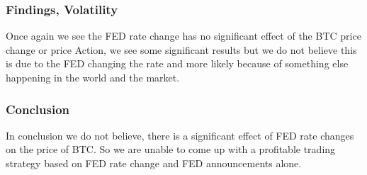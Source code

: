 \documentclass{beamer}
\begin{document}
\begin{frame}
    \frametitle{Findings, Volatility}
Once again we see the FED rate change has no significant effect of the BTC price change or price Action, we see some significant results but we do not believe this is due to the FED changing the rate and more likely because of something else happening in the world and the market.
\end{frame}

\begin{frame}
    \frametitle{Conclusion}
    In conclusion we do not believe, there is a significant effect of FED rate changes on the price of BTC. So we are unable to come up with a profitable trading strategy based on FED rate change and FED announcements alone. 
\end{frame}
\end{document}
